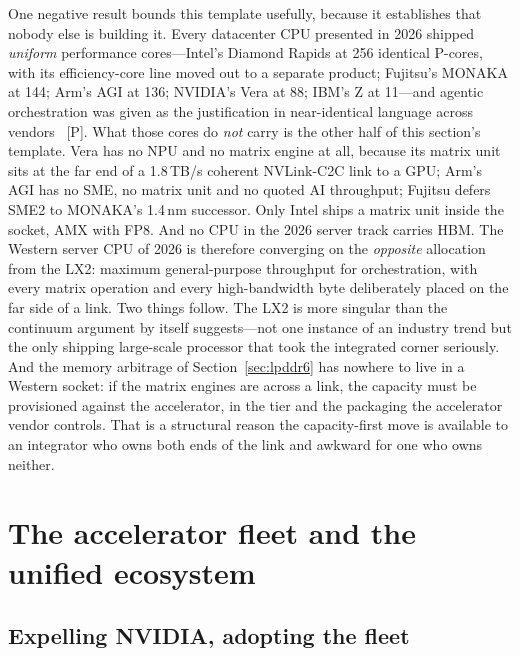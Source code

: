 One negative result bounds this template usefully, because it establishes that nobody else is building it. Every datacenter CPU presented in 2026 shipped \emph{uniform} performance cores---Intel's Diamond Rapids at 256 identical P-cores, with its efficiency-core line moved out to a separate product; Fujitsu's MONAKA at 144; Arm's AGI at 136; NVIDIA's Vera at 88; IBM's Z at 11---and agentic orchestration was given as the justification in near-identical language across vendors~\cite{hc2026} [P]. What those cores do \emph{not} carry is the other half of this section's template. Vera has no NPU and no matrix engine at all, because its matrix unit sits at the far end of a 1.8\,TB/s coherent NVLink-C2C link to a GPU; Arm's AGI has no SME, no matrix unit and no quoted AI throughput; Fujitsu defers SME2 to MONAKA's 1.4\,nm successor. Only Intel ships a matrix unit inside the socket, AMX with FP8. And no CPU in the 2026 server track carries HBM. The Western server CPU of 2026 is therefore converging on the \emph{opposite} allocation from the LX2: maximum general-purpose throughput for orchestration, with every matrix operation and every high-bandwidth byte deliberately placed on the far side of a link. Two things follow. The LX2 is more singular than the continuum argument by itself suggests---not one instance of an industry trend but the only shipping large-scale processor that took the integrated corner seriously. And the memory arbitrage of Section~\ref{sec:lpddr6} has nowhere to live in a Western socket: if the matrix engines are across a link, the capacity must be provisioned against the accelerator, in the tier and the packaging the accelerator vendor controls. That is a structural reason the capacity-first move is available to an integrator who owns both ends of the link and awkward for one who owns neither.

\section{The accelerator fleet and the unified ecosystem}
\label{sec:accel}

\subsection{Expelling NVIDIA, adopting the fleet}

